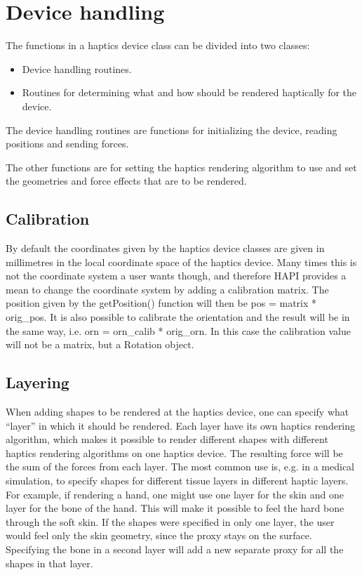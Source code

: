 
\chapter {Device handling}

The functions in a haptics device class can be divided into two classes:

\begin{itemize}
\item Device handling routines.
\item Routines for determining what and how should be rendered haptically
for the device. 
\end{itemize}

The device handling routines are functions for initializing the
device, reading positions and sending forces. 

The other functions are for setting the haptics rendering algorithm
to use and set the geometries and force effects that are to be
rendered.

\section{Calibration}
By default the coordinates given by the haptics device classes are
given in millimetres in the local coordinate space of the haptics
device. Many times this is not the coordinate system a user wants
though, and therefore HAPI provides a mean to change the coordinate
system by adding a calibration matrix. The position given by the
getPosition() function will then be pos = matrix * orig\_pos. It is
also possible to calibrate the orientation and the result will be in
the same way, i.e. orn = orn\_calib * orig\_orn. In this case the
calibration value will not be a matrix, but a Rotation object.

\section{Layering}
When adding shapes to be rendered at the haptics device, one can
specify what ``layer'' in which it should be rendered. Each layer have
its own haptics rendering algorithm, which makes it possible to render
different shapes with different haptics rendering algorithms on one
haptics device. The resulting force will be the sum of the forces from
each layer. The most common use is, e.g. in a medical simulation, to
specify shapes for different tissue layers in different haptic
layers. For example, if rendering a hand, one might use one layer for
the skin and one layer for the bone of the hand. This will make it
possible to feel the hard bone through the soft skin. If the shapes
were specified in only one layer, the user would feel only the skin
geometry, since the proxy stays on the surface. Specifying the bone in
a second layer will add a new separate proxy for all the shapes in
that layer. 

